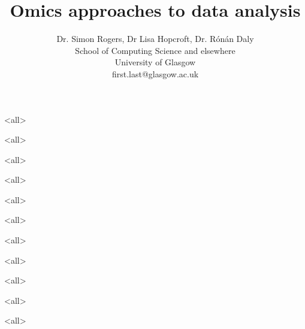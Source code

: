 \documentclass{beamer}
\title{Omics approaches to data analysis}
\author{Dr. Simon Rogers, Dr Lisa Hopcroft, Dr. R\'{o}n\'{a}n Daly\\School of Computing Science and elsewhere\\University of Glasgow\\first.last@glasgow.ac.uk}
\begin{document}
\mode<all>

\begin{frame}
	\titlepage
\end{frame}
\mode<all>

\mode<all>

\mode<all>

\mode<all>

\mode<all>

\mode<all>

\mode<all>

\mode<all>

\mode<all>

\mode<all>

\mode*


\end{document}
